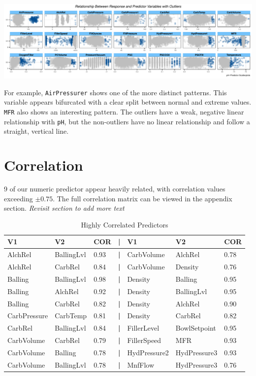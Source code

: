 \documentclass[]{report}
\begin{document}
\includegraphics{Proj2-JM_files/figure-latex/unnamed-chunk-4-1.pdf}

For example, \texttt{AirPressurer} shows one of the more distinct
patterns. This variable appears bifurcated with a clear split between
normal and extreme values. \texttt{MFR} also shows an interesting
pattern. The outliers have a weak, negative linear relationship with
\texttt{pH}, but the non-outliers have no linear relationship and follow
a straight, vertical line.

\hypertarget{correlation}{%
\section{Correlation}\label{correlation}}

9 of our numeric predictor appear heavily related, with correlation
values exceeding \(\pm{0.75}\). The full correlation matrix can be
viewed in the appendix section. \emph{Revisit section to add more text}

\begin{table}[H]

\caption{\label{tab:unnamed-chunk-6}Highly Correlated Predictors}
\fontsize{8}{10}\selectfont
\begin{tabular}{lll>{\bfseries}llll}
\toprule
\textbf{V1} & \textbf{V2} & \textbf{COR} & \textbf{|} & \textbf{V1  } & \textbf{V2 } & \textbf{COR }\\
\midrule
\rowcolor{gray!6}  AlchRel & BallingLvl & 0.93 & | & CarbVolume & AlchRel & 0.78\\
AlchRel & CarbRel & 0.84 & | & CarbVolume & Density & 0.76\\
\rowcolor{gray!6}  Balling & BallingLvl & 0.98 & | & Density & Balling & 0.95\\
Balling & AlchRel & 0.92 & | & Density & BallingLvl & 0.95\\
\rowcolor{gray!6}  Balling & CarbRel & 0.82 & | & Density & AlchRel & 0.90\\
\addlinespace
CarbPressure & CarbTemp & 0.81 & | & Density & CarbRel & 0.82\\
\rowcolor{gray!6}  CarbRel & BallingLvl & 0.84 & | & FillerLevel & BowlSetpoint & 0.95\\
CarbVolume & CarbRel & 0.79 & | & FillerSpeed & MFR & 0.93\\
\rowcolor{gray!6}  CarbVolume & Balling & 0.78 & | & HydPressure2 & HydPressure3 & 0.93\\
CarbVolume & BallingLvl & 0.78 & | & MnfFlow & HydPressure3 & 0.76\\
\bottomrule
\end{tabular}
\end{table}
\end{document}
